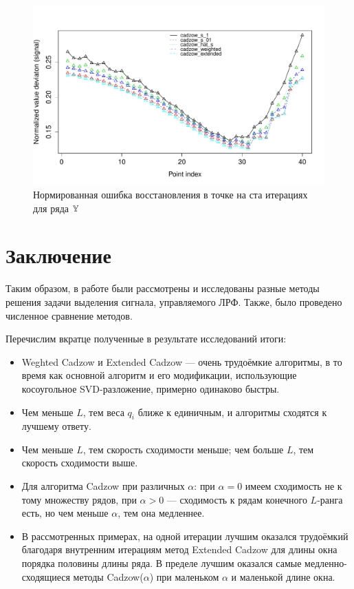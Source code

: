\documentclass[12pt,a4paper,fleqn,leqno]{article}
\begin{document}
\begin{figure}[!h] \begin{center}
\includegraphics[width = 15cm]{s2_it100.pdf}\caption{Нормированная ошибка восстановления в точке на ста итерациях для ряда $\mathbb{Y}$}
\end{center}\end{figure}

\clearpage
\section*{Заключение}
Таким образом, в работе были рассмотрены и исследованы разные методы решения задачи выделения сигнала, управляемого ЛРФ. Также, было проведено численное сравнение методов.

Перечислим вкратце полученные в результате исследований итоги:
\begin{itemize}
\item Weghted Cadzow и Extended Cadzow --- очень трудоёмкие алгоритмы, в то время как основной алгоритм и его модификации, использующие косоугольное SVD-разложение, примерно одинаково быстры.
\item Чем меньше $L$, тем веса $q_i$ ближе к единичным, и алгоритмы сходятся к лучшему ответу.
\item Чем меньше $L$, тем скорость сходимости меньше; чем больше $L$, тем скорость сходимости выше.
\item Для алгоритма Cadzow при различных $\alpha$: при $\alpha = 0$ имеем сходимость не к тому множеству рядов, при $\alpha > 0$ --- сходимость к рядам конечного $L$-ранга есть, но чем меньше $\alpha$, тем она медленнее.
\item
В рассмотренных примерах, на одной итерации лучшим оказался трудоёмкий благодаря внутренним итерациям метод Extended Cadzow для длины окна порядка половины длины ряда.
В пределе лучшим оказался самые медленно-сходящиеся методы Cadzow($\alpha$) при маленьком $\alpha$ и маленькой длине окна.
\end{itemize}




\end{document}
